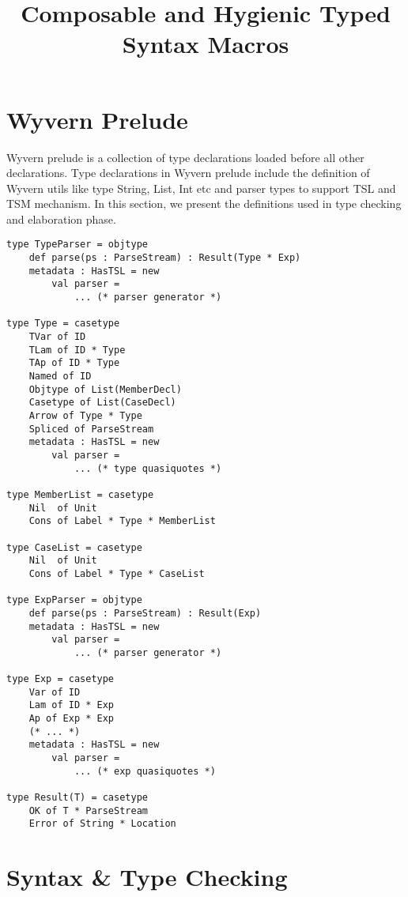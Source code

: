 \documentclass[letterpaper, notitlepage]{article}
\begin{document}
\title{Composable and Hygienic Typed Syntax Macros}
\maketitle

\section{Wyvern Prelude}
Wyvern prelude is a collection of type declarations loaded before all other declarations. Type declarations in Wyvern prelude include the definition of Wyvern utils like type String, List, Int etc and parser types to support TSL and TSM mechanism. In this section, we present the definitions used in type checking and elaboration phase. 
\begin{lstlisting}[style=wyvern]
type TypeParser = objtype
	def parse(ps : ParseStream) : Result(Type * Exp)
	metadata : HasTSL = new 
		val parser = 
			... (* parser generator *)

type Type = casetype
	TVar of ID
	TLam of ID * Type
	TAp of ID * Type
	Named of ID
	Objtype of List(MemberDecl)
	Casetype of List(CaseDecl)
	Arrow of Type * Type
	Spliced of ParseStream
	metadata : HasTSL = new
		val parser = 
			... (* type quasiquotes *)

type MemberList = casetype
	Nil  of Unit
	Cons of Label * Type * MemberList

type CaseList = casetype
	Nil  of Unit
	Cons of Label * Type * CaseList

type ExpParser = objtype
	def parse(ps : ParseStream) : Result(Exp)
	metadata : HasTSL = new 
		val parser = 
			... (* parser generator *)

type Exp = casetype
	Var of ID
	Lam of ID * Exp
	Ap of Exp * Exp
	(* ... *)
	metadata : HasTSL = new
		val parser = 
			... (* exp quasiquotes *)

type Result(T) = casetype
	OK of T * ParseStream
	Error of String * Location
\end{lstlisting}

\section{Syntax \& Type Checking}
\end{document}
